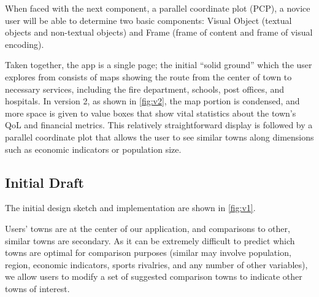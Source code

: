 \documentclass[print]{nuthesis}
\begin{document}
When faced with the next component, a parallel coordinate plot (PCP), a novice user will be able to determine two basic components: Visual Object (textual objects and non-textual objects) and Frame (frame of content and frame of visual encoding).

Taken together, the app is a single page; the initial ``solid ground'' which the user explores from consists of maps showing the route from the center of town to necessary services, including the fire department, schools, post offices, and hospitals. In version 2, as shown in \autoref{fig:v2}, the map portion is condensed, and more space is given to value boxes that show vital statistics about the town's QoL and financial metrics. This relatively straightforward display is followed by a parallel coordinate plot that allows the user to see similar towns along dimensions such as economic indicators or population size.

\hypertarget{initial-draft}{%
\subsection{Initial Draft}\label{initial-draft}}

The initial design sketch and implementation are shown in \autoref{fig:v1}.

Users' towns are at the center of our application, and comparisons to other, similar towns are secondary. As it can be extremely difficult to predict which towns are optimal for comparison purposes (similar may involve population, region, economic indicators, sports rivalries, and any number of other variables), we allow users to modify a set of suggested comparison towns to indicate other towns of interest.
\end{document}
